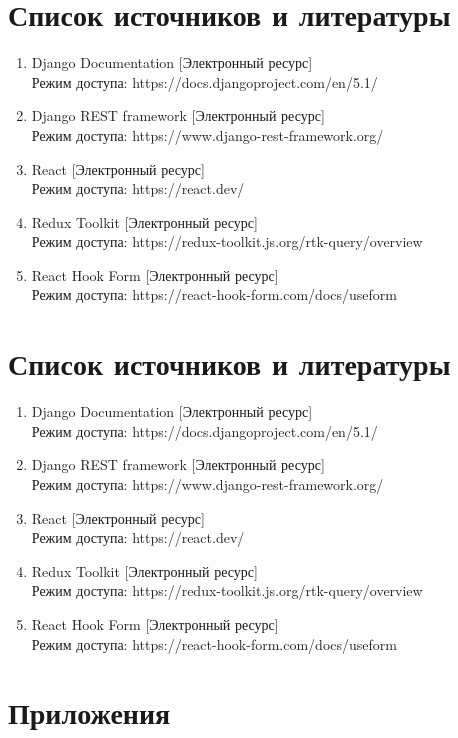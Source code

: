 \documentclass[a4paper,14pt]{extarticle}
\begin{document}
\newpage

\section{Список источников и литературы}
\begin{enumerate}
    \item Django Documentation [Электронный ресурс] \\Режим доступа: https://docs.djangoproject.com/en/5.1/
    \item Django REST framework [Электронный ресурс] \\Режим доступа: https://www.django-rest-framework.org/
    \item React [Электронный ресурс] \\Режим доступа: https://react.dev/
    \item Redux Toolkit [Электронный ресурс] \\Режим доступа: https://redux-toolkit.js.org/rtk-query/overview
    \item React Hook Form [Электронный ресурс] \\Режим доступа: https://react-hook-form.com/docs/useform
\end{enumerate}

\section{Список источников и литературы}
\begin{enumerate}
    \item Django Documentation [Электронный ресурс] \\Режим доступа: https://docs.djangoproject.com/en/5.1/
    \item Django REST framework [Электронный ресурс] \\Режим доступа: https://www.django-rest-framework.org/
    \item React [Электронный ресурс] \\Режим доступа: https://react.dev/
    \item Redux Toolkit [Электронный ресурс] \\Режим доступа: https://redux-toolkit.js.org/rtk-query/overview
    \item React Hook Form [Электронный ресурс] \\Режим доступа: https://react-hook-form.com/docs/useform
\end{enumerate}

\iffalse
\section{Приложения}
\end{document}
